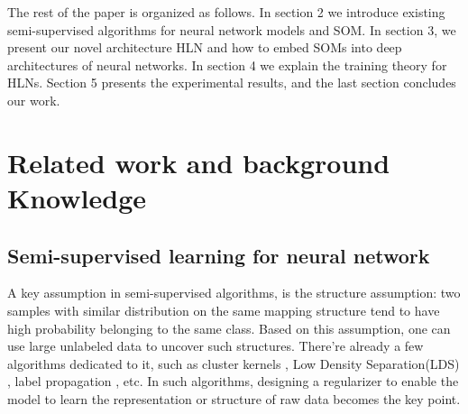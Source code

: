 \documentclass[3p,times,procedia]{elsarticle}
\begin{document}
The rest of the paper is organized
as follows.
In section 2 we introduce existing
semi-supervised algorithms for neural
network models and SOM.
In section 3, we present our novel
architecture HLN and how to
embed SOMs into deep architectures of
neural networks.
In section 4 we explain the 
training theory for HLNs.
Section 5 presents the experimental
results, and the
last section concludes our work.

\section{Related work and background
Knowledge}
\label{sec:related_work}
\subsection{Semi-supervised learning for
neural network}
A key assumption in semi-supervised 
algorithms, is the 
structure assumption: two samples with 
similar distribution on the same mapping 
structure tend to have high probability 
belonging to the same class. Based on 
this assumption, one can use large 
unlabeled data to uncover such 
structures. There're already a few 
algorithms dedicated to it,
such as cluster kernels
\cite{chapelle2003cluster},
Low Density Separation(LDS)
\cite{chapelle2005semi},
label propagation
\cite{zhu2002learning},
etc.
In such algorithms, designing 
a regularizer
to enable the model to learn 
the representation
or structure of raw data
becomes the key point.
\end{document}
